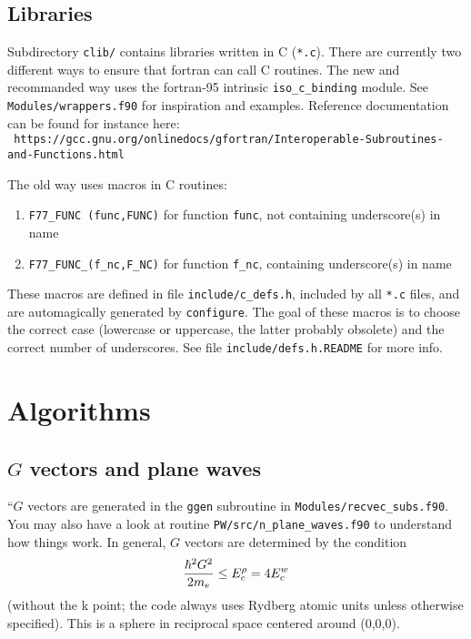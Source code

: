 \documentclass[12pt,a4paper]{article}
\def\configure{\texttt{configure}}
\begin{document}
\subsection{Libraries}

Subdirectory \texttt{clib/} contains libraries written in C
(\texttt{*.c}). There are currently two different ways to
ensure that fortran can call C routines. The new and recommanded
way uses the fortran-95 intrinsic \texttt{iso\_c\_binding} module.
See \texttt{Modules/wrappers.f90} for inspiration and examples.
Reference documentation can be found for instance here:\\
{\tt
https://gcc.gnu.org/onlinedocs/gfortran/Interoperable-Subroutines-and-Functions.html}

The old way uses macros in C routines:
\begin{enumerate}
\item \texttt{F77\_FUNC (func,FUNC)} for function \texttt{func}, not
  containing underscore(s) in name
\item \texttt{F77\_FUNC\_(f\_nc,F\_NC)} for function \texttt{f\_nc},
  containing underscore(s) in name
\end{enumerate}
These macros are defined in file \texttt{include/c\_defs.h},
included by all \texttt{*.c} files, and are automagically
generated by \configure. The goal of these macros is to
choose the correct case (lowercase or uppercase, the latter
probably obsolete) and the correct number of underscores.
See file \texttt{include/defs.h.README} for more info.


\section{Algorithms}

\subsection{$G$ vectors and plane waves}

``$G$ vectors are generated in the \texttt{ggen} subroutine in
\texttt{Modules/recvec\_subs.f90}. You may also have a look at routine
\texttt{PW/src/n\_plane\_waves.f90} to understand how things work.
In general, $G$ vectors are determined by the condition
\begin{equation}
  { \hbar^2 G^2 \over 2m_e} \le E^\rho_c = 4 E^w_c
\end{equation}
(without the k point; the code always uses Rydberg atomic units unless
otherwise specified). This is a sphere in reciprocal space centered
around (0,0,0).
\end{document}
